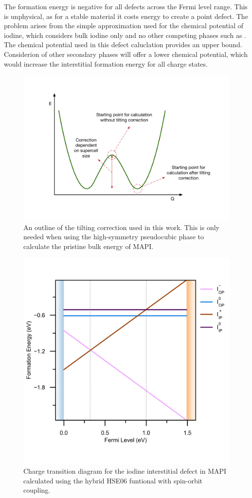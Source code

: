 The formation energy is negative for all defects across the Fermi level range. This is unphysical, as for a stable material it costs energy to create a point defect. The problem arises from the simple approximation used for the chemical potential of iodine, which considers bulk iodine only and no other competing phases such as . The chemical potential used in this defect caluclation provides an upper bound. Considerion of other secondary phases will offer a lower chemical potential, which would increase the interstitial formation energy for all charge states. 


\begin{figure}[h!]   
\centering
  \includegraphics[width=0.7\columnwidth]{figures/ch6/tilting_correction.png}
  \caption[Tilting correction for defect formation energies]{An outline of the tilting correction used in this work. This is only needed when using the high-symmetry pseudocubic phase to calculate the pristine bulk energy of MAPI.}
\label{tilting_correction}
\end{figure}

\begin{figure}[h!]   
\centering
  \includegraphics[width=0.7\columnwidth]{figures/ch6/charge_transition_HSE.png}
  \caption[Charge transition diagram for the iodine interstitial defect in MAPI]{Charge transition diagram for the iodine interstitial defect in MAPI calculated using the hybrid HSE06 funtional with spin-orbit coupling.}
\label{charge_transition_diagram}
\end{figure}



